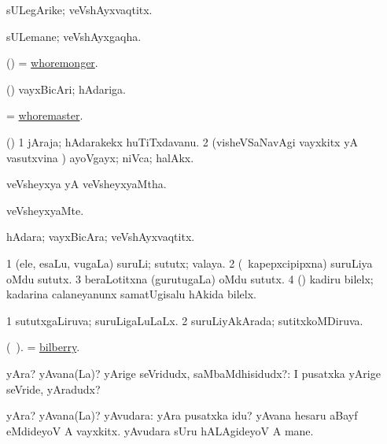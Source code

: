 \bentry
{}
\gl{\nA}
\bmng
sULegArike; veVshAyxvaqtitx. 
\emng
\eentry

\bentry
{}
\gl{\nA}
\bmng
sULemane; veVshAyxgaqha. 
\emng
\eentry

\bentry
{}
\gl{\nA}
\bmng
(\pArxparx) = \hyperlink{whoremonger}{whoremonger}. 
\emng
\eentry

\bentry
{}
\gl{\nA}
\bmng
(\pArxparx) vayxBicAri; hAdariga. 
\emng
\eentry

\bentry
{}
\gl{\nA}
\bmng
= \hyperlink{whoremaster}{whoremaster}. 
\emng
\eentry

\bentry
{}
\gl{\nA}
\bmng
(\pArxparx) 
\bnum
\num{1} jAraja; hAdarakekx huTiTxdavanu. 
\num{2} (visheVSaNavAgi vayxkitx yA vasutxvina \vi) ayoVgayx; niVca; halAkx. 
\enum
\emng
\eentry

\bentry
{}
\gl{\gu}
\bmng
veVsheyxya yA veVsheyxyaMtha. 
\emng
\eentry

\bentry
{}
\gl{\kirxvi}
\bmng
veVsheyxyaMte. 
\emng
\eentry

\bentry
{}
\gl{\nA}
\bmng
hAdara; vayxBicAra; veVshAyxvaqtitx. 
\emng
\eentry

\bentry
{}
\gl{\nA}
\expl{}
\bmng
\bnum
\num{1} (ele, esaLu, \mo vugaLa) suruLi; sututx; valaya. 
\num{2} (\kanmu\ kapepxcipipxna) suruLiya oMdu sututx. 
\num{3} beraLotitxna (gurutugaLa) oMdu sututx. 
\num{4} (\pArxparx) kadiru bilelx; kadarina calaneyanunx samatUgisalu hAkida bilelx. 
\enum
\emng
\eentry

\bentry
{}
\gl{\gu}
\bmng
\bnum
\num{1} sututxgaLiruva; suruLigaLuLaLx.
\num{2} suruLiyAkArada; sutitxkoMDiruva. 
\enum
\emng
\eentry

\bentry
{}
\gl{\nA}(\bava\ ). 
\bmng
= \hyperref{kandict_b.pdf}{B}{bilberry}{bilberry}. 
\emng
\eentry

\bentry
{} 
\gl{\sanA}
\expl{}
\bmng
yAra? yAvana(La)? yArige seVridudx, saMbaMdhisidudx?:  I pusatxka yArige seVride, yAradudx? 
\emng
\eentry

\bentry
{} 
\gl{\gu}
\bmng
yAra? yAvana(La)? yAvudara:  yAra pusatxka idu?  yAvana hesaru aBayf eMdideyoV A vayxkitx.  yAvudara sUru hALAgideyoV A mane. 
\emng
\eentry

